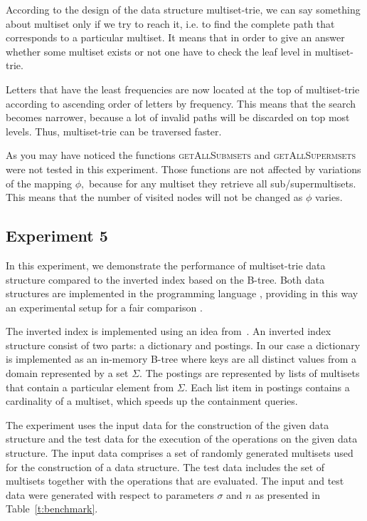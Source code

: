 According to the design of the data structure multiset-trie, we can say 
something about multiset only if we try to reach it, i.e. to find the complete 
path that corresponds to a particular multiset. It means that in order to give 
an answer whether some multiset exists or not one have to check the leaf level in 
multiset-trie. 

Letters that have the least frequencies are now located at the top of 
multiset-trie according to ascending order of letters by frequency. This means 
that the search becomes narrower, because a lot of invalid paths will be 
discarded on top most levels. Thus, multiset-trie can be traversed faster.

As you may have noticed the functions \textsc{getAllSubmsets} and 
\textsc{getAllSupermsets} were not tested in this experiment. Those functions 
are not affected by variations of the mapping $\phi,$ because for any multiset 
they retrieve all sub/supermultisets. This means that the number of visited 
nodes will not be changed as $\phi$ varies.

\subsection{Experiment 5} \label{s:exp5}
In this experiment, we demonstrate the performance of multiset-trie data structure compared to the inverted index based on the B-tree. Both data structures are implemented in the programming language \CC, providing in this way an experimental setup for a fair comparison \cite{akulich2019mstrie}.

The inverted index is implemented using an idea from~\cite{Helmer2003}. An inverted index structure consist of two parts: a dictionary and postings. In our case a dictionary is implemented as an in-memory B-tree where keys are all distinct values from a domain represented by a set $\Sigma.$ The postings are represented by lists of multisets that contain a particular element from $\Sigma.$ Each list item in postings contains a cardinality of a multiset, which speeds up the containment queries.

The experiment uses the input data for the construction of the given data structure and the test data for the execution of the operations on the given data structure. The input data comprises a set of randomly generated multisets used for the construction of a data structure. The test data includes the set of multisets together with the operations that are evaluated. The input and test data were generated with respect to parameters $\sigma$ and $n$ as presented in Table~\ref{t:benchmark}.

